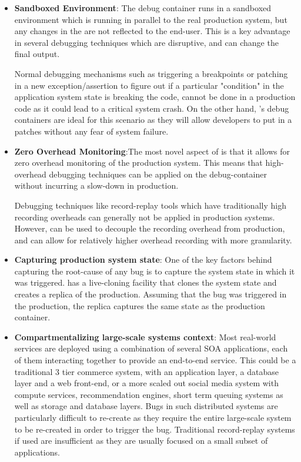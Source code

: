 \begin{itemize}
	
	\item \textbf{Sandboxed Environment}: The debug container runs in a sandboxed environment which is running in parallel to the real production system, but any changes in the \debugcontainer are not reflected to the end-user. This is a key advantage in several debugging techniques which are disruptive, and can change the final output. 
	
	Normal debugging mechanisms such as triggering a breakpoints or patching in a new exception/assertion to figure out if a particular "condition" in the application system state is breaking the code, cannot be done in a production code as it could lead to a critical system crash. On the other hand, \parikshan's debug containers are ideal for this scenario as they will allow developers to put in a patches without any fear of system failure.
	
	\item \textbf{Zero Overhead Monitoring}:The most novel aspect of \parikshan is that it allows for zero overhead monitoring of the production system. This means that high-overhead debugging techniques can be applied on the debug-container without incurring a slow-down in production.
	
	Debugging techniques like record-replay tools which have traditionally high recording overheads can generally not be applied in production systems. However, \parikshan can be used to decouple the recording overhead from production, and can allow for relatively higher overhead recording with more granularity.
	
	\item \textbf{Capturing production system state}:
	One of the key factors behind capturing the root-cause of any bug is to capture the system state in which it was triggered. \parikshan has a live-cloning facility that clones the system state and creates a replica of the production. Assuming that the bug was triggered in the production, the replica captures the same state as the production container.
	
	\item \textbf{Compartmentalizing large-scale systems context}:
	Most real-world services are deployed using a combination of several SOA applications, each of them interacting together to provide an end-to-end service. This could be a traditional 3 tier commerce system, with an application layer, a database layer and a web front-end, or a more scaled out social media system with compute services, recommendation engines, short term queuing systems as well as storage and database layers. 
	Bugs in such distributed systems are particularly difficult to re-create as they require the entire large-scale system to be re-created in order to trigger the bug. 
	Traditional record-replay systems if used are insufficient as they are usually focused on a small subset of applications.
	

\end{itemize}
